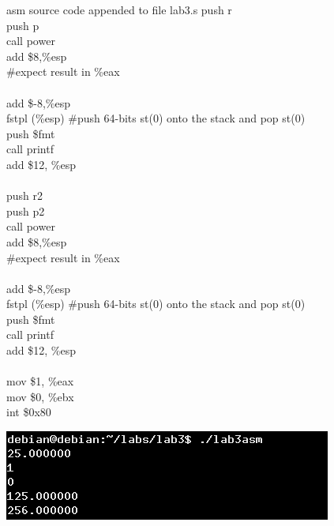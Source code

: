 \documentclass{article}
\begin{document}
\begin{multicols}{2}
\begin{GFT}{asm source code appended to file lab3.s}
\+  push r\\
\+  push p\\
\+  call power\\
\+  add \$8,\%esp\\
\+  \#expect result in \%eax\\
\+\\
\+  add \$-8,\%esp \\
\+  fstpl (\%esp) \#push 64-bits st(0) onto the stack and pop st(0)\\
\+  push \$fmt\\
\+  call printf\\
\+  add \$12, \%esp\\
\+\\
\+  push r2\\
\+  push p2\\
\+  call power\\
\+  add \$8,\%esp\\
\+  \#expect result in \%eax\\
\+\\
\+  add \$-8,\%esp \\
\+  fstpl (\%esp) \#push 64-bits st(0) onto the stack and pop st(0)\\
\+  push \$fmt\\
\+  call printf\\
\+  add \$12, \%esp\\
\+  \\
\+  mov \$1, \%eax\\
\+  mov \$0, \%ebx\\
\+  int \$0x80\\
\end{GFT}
\columnbreak
\includegraphics[scale=0.7]{lab3s.png}
\end{multicols}
\end{document}
